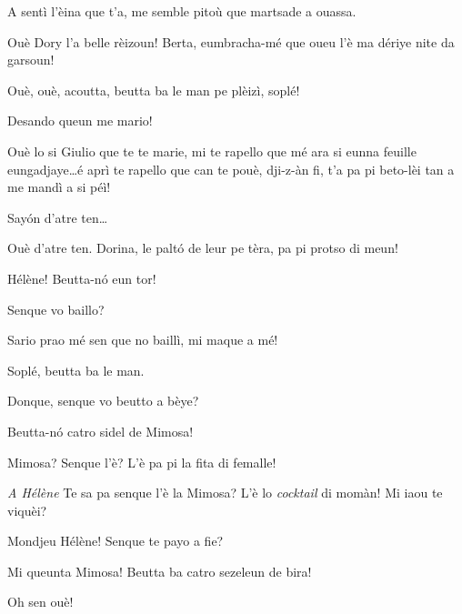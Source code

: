 \begin{drama}
\Dorinaspeaks A sentì l’èina que t’a, me semble pitoù que martsade a ouassa.


\Giuliospeaks Ouè Dory l’a belle rèizoun! Berta, eumbracha-mé que oueu l’è ma dériye nite da garsoun!

\Bertaspeaks{} Ouè, ouè, acoutta, beutta ba le man pe plèizì, soplé!


\Giuliospeaks{} Desando queun me mario!

\Bertaspeaks{} Ouè lo si Giulio que te te marie, mi te rapello que mé ara si eunna feuille eungadjaye\ldots é aprì te rapello que can te pouè, dji-z-àn fi, t'a pa pi beto-lèi tan a me mandì a si péì!

\Giuliospeaks Say\'on d'atre ten\ldots

\Bertaspeaks{} Ouè d'atre ten. Dorina, le palt\'o de leur pe tèra, pa pi protso di meun!

\Marcospeaks Hélène! Beutta-n\'o eun tor!

\Helenespeaks Senque vo baillo?

\Federicospeaks{} Sario prao mé sen que no baillì, mi maque a mé! 


\Bertaspeaks{} Soplé, beutta ba le man.

\Helenespeaks Donque, senque vo beutto a bèye?

\Marcospeaks{} Beutta-n\'o catro sidel de Mimosa!

\Helenespeaks Mimosa? Senque l'è? L'è pa pi la fita di femalle!

\Michelspeaks\textit{A Hélène} Te sa pa senque l'è la Mimosa? L'è lo \textit{cocktail} di momàn! Mi iaou te viquèi?

\Bertaspeaks Mondjeu Hélène! Senque te payo a fie?

\Federicospeaks Mi queunta Mimosa! Beutta ba catro sezeleun de bira! 

\Helenespeaks Oh sen ouè!

\scene[-- Si le man!]



\end{drama}

